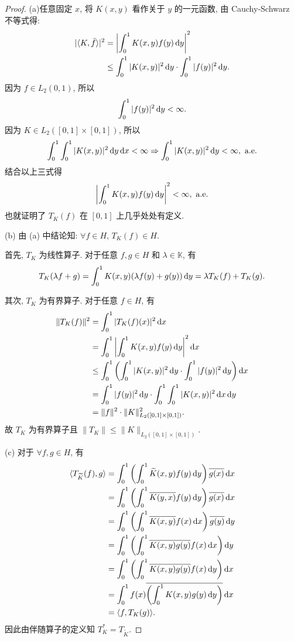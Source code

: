 \begin{proof}
    (a)任意固定 $x$, 将 $K(x,y)$ 看作关于 $y$ 的一元函数, 由 Cauchy-Schwarz 不等式得:
    \begin{align*}
        |\langle K,\bar{f}\rangle|^2
        & =\left|\int_0^1K(x,y)f(y)\mathop{}\!\mathrm{d} y\right|^2 \\
        & \leq\int_0^1|K(x,y)|^2\mathop{}\!\mathrm{d} y\cdot\int_0^1|f(y)|^2\mathop{}\!\mathrm{d} y.
    \end{align*}
    因为 $f\in L_2(0,1)$, 所以
    \[\int_0^1|f(y)|^2\mathop{}\!\mathrm{d} y<\infty.\]
    因为 $K\in L_2([0,1]\times [0,1])$, 所以
    \[\int_0^1\int_0^1|K(x,y)|^2\mathop{}\!\mathrm{d} y\mathop{}\!\mathrm{d} x<\infty\Rightarrow\int_0^1|K(x,y)|^2\mathop{}\!\mathrm{d} y<\infty, \text{ a.e.}\]
    结合以上三式得
    \[\left|\int_0^1K(x,y)f(y)\mathop{}\!\mathrm{d} y\right|^2<\infty, \text{ a.e.}\]
    也就证明了 $T_K(f)$ 在 $[0,1]$ 上几乎处处有定义.

    (b) 由 (a) 中结论知: $\forall f\in H$, $T_K(f)\in H$.

    首先, $T_K$ 为线性算子. 对于任意 $f,g\in H$ 和 $\lambda\in\mathbb{K}$, 有
    \[T_K(\lambda f+g)=\int_0^1K(x,y)(\lambda f(y)+g(y))\mathop{}\!\mathrm{d} y=\lambda T_K(f)+T_K(g).\] 

    其次, $T_K$ 为有界算子. 对于任意 $f\in H$, 有
    \begin{align*}
        \|T_K(f)\|^2
        &=\int_0^1|T_K(f)(x)|^2\diff x\\
        &=\int_0^1\left|\int_0^1K(x,y)f(y)\diff y\right|^2\diff x\\
        &\leq \int_0^1\left(\int_0^1|K(x,y)|^2\diff y\cdot\int_0^1|f(y)|^2\diff y\right)\diff x\\
        &=\int_0^1|f(y)|^2\diff y\cdot\int_0^1\int_0^1|K(x,y)|^2\diff x\diff y\\
        &=\|f\|^2\cdot\|K\|_{L_2([0,1]\times[0,1])}^2.
    \end{align*}
    故 $T_K$ 为有界算子且 $\|T_K\|\leq \|K\|_{L_2([0,1]\times [0,1])}$.


    (c) 对于 $\forall f,g\in H$, 有
    \begin{align*}
        \langle T_{\widetilde{K}}(f),g\rangle&=\int_0^1\left(\int_0^1\widetilde{K}(x,y)f(y)\diff y\right)\conjugate{g(x)}\diff x\\
        &=\int_0^1\left(\int_0^1\overline{K(y,x)}f(y)\diff y\right)\conjugate{g(x)}\diff x \\
        &=\int_0^1\left(\int_0^1\overline{K(x,y)}f(x)\diff x\right)\conjugate{g(y)}\diff y \\
        &=\int_0^1\left(\int_0^1\overline{K(x,y)g(y)}f(x)\diff x\right)\diff y \\
        &=\int_0^1\left(\int_0^1\overline{K(x,y)g(y)}f(x)\diff y\right)\diff x \\
        &=\int_0^1f(x)\overline{\left(\int_0^1K(x,y)g(y)\diff y\right)}\diff x \\
        &=\langle f,T_K(g)\rangle.
    \end{align*}
    因此由伴随算子的定义知 $T_K^{*}=T_{\widetilde{K}}$.


\end{proof}
